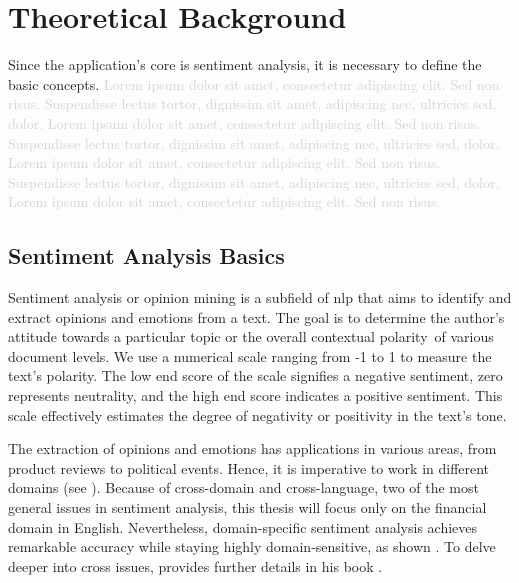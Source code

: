 \chapter{Theoretical Background}
\label{chap:theoretical-background}
Since the application's core is sentiment analysis, it is necessary to define the basic concepts. \textcolor{lightgray}{Lorem ipsum dolor sit amet, consectetur adipiscing elit. Sed non risus. Suspendisse lectus tortor, dignissim sit amet, adipiscing nec, ultricies sed, dolor. Lorem ipsum dolor sit amet, consectetur adipiscing elit. Sed non risus. Suspendisse lectus tortor, dignissim sit amet, adipiscing nec, ultricies sed, dolor. Lorem ipsum dolor sit amet, consectetur adipiscing elit. Sed non risus. Suspendisse lectus tortor, dignissim sit amet, adipiscing nec, ultricies sed, dolor. Lorem ipsum dolor sit amet, consectetur adipiscing elit. Sed non risus.}

\section{Sentiment Analysis Basics}
\label{sec:sentiment-analysis-basics}
Sentiment analysis or opinion mining is a subfield of \acrshort{nlp} that aims to identify and extract opinions and emotions from a text. The goal is to determine the author's attitude towards a particular topic or the overall contextual polarity~of various document levels. We use a numerical scale ranging from -1 to 1 to measure the text's polarity. The low end score of the scale signifies a negative sentiment, zero represents neutrality, and the high end score indicates a positive sentiment. This scale effectively estimates the degree of negativity or positivity in the text's tone. 

The extraction of opinions and emotions has applications in various areas, from product reviews to political events. Hence, it is imperative to work in different domains (see \cite{PIRYANI2017122}). Because of cross-domain and cross-language, two of the most general issues in sentiment analysis, this thesis will focus only on the financial domain in English. Nevertheless, domain-specific sentiment analysis achieves remarkable accuracy while staying highly domain-sensitive, as shown \cite{saunders_2020}. To delve deeper into cross issues, \citeauthor{liu2022sentiment} provides further details in his book .

